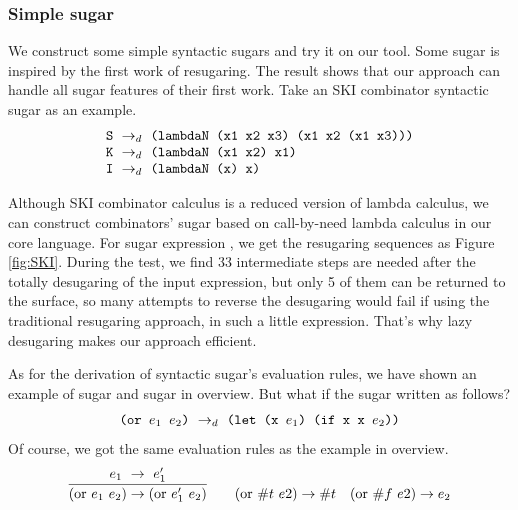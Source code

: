 \subsubsection{Simple sugar}
\label{mark:simple}

We construct some simple syntactic sugars and try it on our tool. Some sugar is inspired by the first work of resugaring\cite{resugaring}. The result shows that our approach can handle all sugar features of their first work.
Take an SKI combinator syntactic sugar as an example.
\[
\begin{array}{l}
\mbox{\tt S} ~\rightarrow_d~ \texttt{(lambdaN (x1 x2 x3) (x1 x2 (x1 x3)))}\\
\mbox{\tt K} ~\rightarrow_d~ \texttt{(lambdaN (x1 x2) x1)}\\
\mbox{\tt I} ~\rightarrow_d~ \texttt{(lambdaN (x) x)}
\end{array}
\]




Although SKI combinator calculus is a reduced version of lambda calculus, we can construct combinators' sugar based on call-by-need lambda calculus in our core language. For sugar expression , we get the resugaring sequences as Figure \ref{fig:SKI}. During the test, we find 33 intermediate steps are needed after the totally desugaring of the input expression, but only 5 of them can be returned to the surface, so many attempts to reverse the desugaring would fail if using the traditional resugaring approach, in such a little expression. That's why lazy desugaring makes our approach efficient.





As for the derivation of syntactic sugar's evaluation rules, we have shown an example of  sugar and  sugar in overview. But what if the  sugar written as follows?
\[\texttt{(or $e_1$ $e_2$)} ~\rightarrow_d~ \texttt{(let (x $e_1$) (if x x $e_2$))}\]
Of course, we got the same evaluation rules as the example in overview.
\[
\begin{array}{c}
\infer {(\mbox{or}~e_1~e_2) \rightarrow (\mbox{or}~e_1'~e_2)} {e_1~ \rightarrow~e_1'}
\qquad
(\mbox{or}~\#t~e2) \rightarrow \#t
\quad
(\mbox{or}~\#f~e2) \rightarrow e_2 \\
\end{array}
\]

